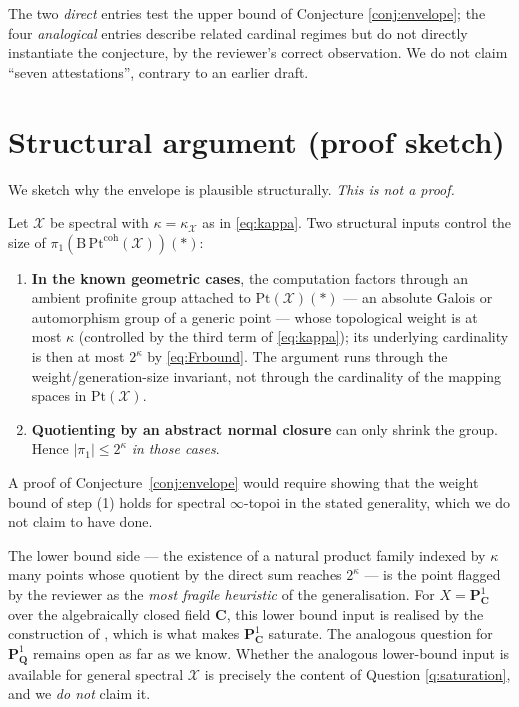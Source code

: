 \documentclass[11pt]{article}
\theoremstyle{definition}
\theoremstyle{plain}
\theoremstyle{remark}
\newcommand{\Pt}{\mathrm{Pt}}
\newcommand{\Bcat}{\mathrm{B}}
\newcommand{\Pone}{\mathbf{P}^{1}}
\newcommand{\C}{\mathbf{C}}
\newcommand{\Q}{\mathbf{Q}}
\begin{document}
The two \emph{direct} entries test the upper bound of
Conjecture \ref{conj:envelope}; the four \emph{analogical} entries describe
related cardinal regimes but do not directly instantiate the conjecture, by
the reviewer's correct observation. We do not claim ``seven attestations'',
contrary to an earlier draft.

\section{Structural argument (proof sketch)}\label{sec:sketch}

We sketch why the envelope is plausible structurally. \emph{This is not a
proof.}

Let $\mathcal{X}$ be spectral with $\kappa = \kappa_{\mathcal X}$ as in
\eqref{eq:kappa}. Two structural inputs control the size of
$\pi_1(\Bcat\,\Pt^{\mathrm{coh}}(\mathcal{X}))(\ast)$:

\begin{enumerate}
\item \textbf{In the known geometric cases}, the computation factors
through an ambient profinite group attached to $\Pt(\mathcal X)(\ast)$ ---
an absolute Galois or automorphism group of a generic point --- whose
topological weight is at most $\kappa$ (controlled by the third term of
\eqref{eq:kappa}); its underlying cardinality is then at most $2^{\kappa}$
by \eqref{eq:Frbound}. The argument runs through the
weight/generation-size invariant, not through the cardinality of the
mapping spaces in $\Pt(\mathcal X)$.
\item \textbf{Quotienting by an abstract normal closure} can only shrink the
group. Hence $|\pi_1| \le 2^{\kappa}$ \emph{in those cases}.
\end{enumerate}

A proof of Conjecture~\ref{conj:envelope} would require showing that the
weight bound of step (1) holds for spectral $\infty$-topoi in the stated
generality, which we do not claim to have done.

The lower bound side --- the existence of a natural product family indexed by
$\kappa$ many points whose quotient by the direct sum reaches $2^{\kappa}$ ---
is the point flagged by the reviewer as the \emph{most fragile heuristic} of
the generalisation. For $X = \Pone_{\C}$ over the algebraically closed field $\C$,
this lower bound input is realised by the construction of
\cite[\S 7.1]{HHLMMW2025}, which is what makes $\Pone_{\C}$ saturate.
The analogous question for $\Pone_{\Q}$ remains open as far as we know. Whether
the analogous lower-bound input is available for general spectral
$\mathcal X$ is precisely the content of Question \ref{q:saturation}, and we
\emph{do not} claim it.
\end{document}
